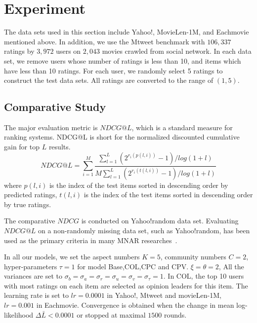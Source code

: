 \documentclass[sigconf]{acmart}
\begin{document}
\section{Experiment}\label{sec:experiment}

The data sets used in this section include Yahoo!, MovieLen-1M, and Eachmovie mentioned above. In addition, we use the Mtweet benchmark with $106,337$ ratings by $3,972$ users on $2,043$ movies crawled from social network. In each data set, we remove users whose number of ratings is less than 10, and items which have less than 10 ratings. For each user, we randomly select 5 ratings to construct the test data sets. All ratings are converted to the range of $(1,5)$.


\subsection{Comparative Study}

The major evaluation metric is $NDCG@L$, which is a standard measure for ranking systems.   NDCG@L is short for the normalized discounted cumulative gain for top $L$ results. 
\begin{equation}
NDCG@L=\sum\limits_{i=1}^{M}\frac{\sum_{l=1}^{L}(2^{r_{i}(p(l,i))}-1)/log(1+l)}{M\sum_{l=1}^{L}(2^{r_{i}(t(l,i))}-1)/log(1+l)}
\end{equation}
where $p(l,i)$ is the index of the test items sorted in descending order by predicted ratings, $t(l,i)$ is the index of the test items sorted in descending order by true ratings.

The comparative $NDCG$ is conducted on Yahoo!random data set. Evaluating $NDCG@L$ on a non-randomly missing data set, such as Yahoo!random, has been used as the primary criteria in many MNAR researches~\cite{Hernandez-Lobato2014Probabilistic,Marlin2009Collaborative}.

In all our models, we set the aspect numbers $K=5$, community numbers $C=2$, hyper-parameters  $\tau=1$ for model Base,COL,CPC and CPV.  $\xi=\theta=2$, All the variances are set to $\sigma_b=\sigma_a=\sigma_r=\sigma_u=\sigma_v=\sigma_\tau=1$. In COL, the top 10 users with most ratings on each item are selected as opinion leaders for this item. The learning rate is set to $lr=0.0001$ in Yahoo!, Mtweet and movieLen-1M, $lr=0.001$ in Eachmovie. Convergence is obtained when the change in mean log-likelihood $\Delta\bar{L}<0.0001$ or stopped at maximal $1500$ rounds.  
\end{document}
